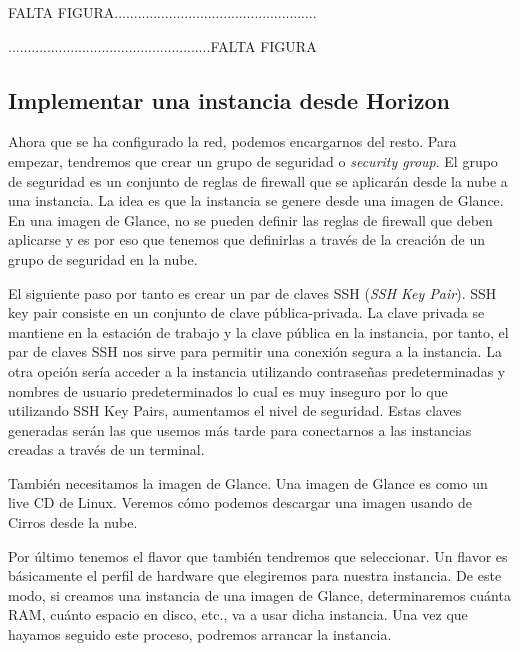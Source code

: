\begin{tcolorbox}[colback=green!5!white,colframe=green!75!black]
FALTA FIGURA....................................................

....................................................FALTA FIGURA
\end{tcolorbox}

\subsection{Implementar una instancia desde Horizon}
Ahora que se ha configurado la red, podemos encargarnos del resto. Para empezar, tendremos que crear un grupo de seguridad o \textit{security group}. El grupo de seguridad es un conjunto de reglas de firewall que se aplicarán desde la nube a una instancia. La idea es que la instancia se genere desde una imagen de Glance. En una imagen de Glance, no se pueden definir las reglas de firewall que deben aplicarse y es por eso que tenemos que definirlas a través de la creación de un grupo de seguridad en la nube.

El siguiente paso por tanto es crear un par de claves SSH (\textit{SSH Key Pair}). SSH key pair consiste en un conjunto de clave pública-privada. La clave privada se mantiene en la estación de trabajo y la clave pública en la instancia, por tanto, el par de claves SSH nos sirve para permitir una conexión segura a la instancia. La otra opción sería acceder a la instancia utilizando contraseñas predeterminadas y nombres de usuario predeterminados lo cual es muy inseguro por lo que utilizando SSH Key Pairs, aumentamos el nivel de seguridad. Estas claves generadas serán las que usemos más tarde para conectarnos a las instancias creadas a través de un terminal.

También necesitamos la imagen de Glance. Una imagen de Glance es como un live CD de Linux. Veremos cómo podemos descargar una imagen usando de Cirros desde la nube.

Por último tenemos el flavor que también tendremos que seleccionar. Un flavor es básicamente el perfil de hardware que elegiremos para nuestra instancia. De este modo, si creamos una instancia de una imagen de Glance, determinaremos cuánta RAM, cuánto espacio en disco, etc., va a usar dicha instancia. Una vez que hayamos seguido este proceso, podremos arrancar la instancia.


